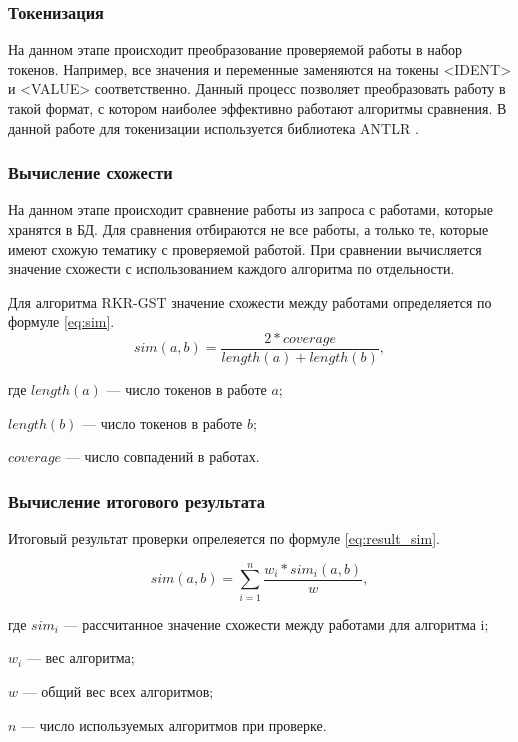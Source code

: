 		\subsubsection{Токенизация}

			На данном этапе происходит преобразование проверяемой работы в набор токенов. Например, все значения и переменные заменяются на токены <IDENT> и <VALUE> соответственно. Данный процесс позволяет преобразовать работу в такой формат, с котором наиболее эффективно работают алгоритмы сравнения. В данной работе для токенизации используется библиотека ANTLR \cite{Parr2013}.

		\subsubsection{Вычисление схожести}

			На данном этапе происходит сравнение работы из запроса с работами, которые хранятся в БД. Для сравнения отбираются не все работы, а только те, которые имеют схожую тематику с проверяемой работой. При сравнении вычисляется значение схожести с использованием каждого алгоритма по отдельности.

			Для алгоритма RKR-GST значение схожести между работами определяется по формуле \ref{eq:sim}.
			\begin{equation}\label{eq:sim}
				sim(a,b) = \frac{ 2 * coverage }{ length(a) + length(b) },
			\end{equation}
			\begin{ESKDexplanation}
				\item[где ] $length(a)$ --- число токенов в работе $a$;
				\item$length(b)$ --- число токенов в работе $b$;
				\item$coverage$ --- число совпадений в работах.		
			\end{ESKDexplanation}

		\subsubsection{Вычисление итогового результата}		

			Итоговый результат проверки опрелеяется по формуле \ref{eq:result_sim}.

			\begin{equation}\label{eq:result_sim}
				sim(a,b) = \sum_{i=1}^{n} \frac{ w_i * sim_i(a,b) }{ w },				 
			\end{equation}
			\begin{ESKDexplanation}
				\item[где ] $sim_i$ --- рассчитанное значение схожести между работами для алгоритма i;
				\item$w_i$ --- вес алгоритма;
				\item$w$ --- общий вес всех алгоритмов;
				\item$n$ --- число используемых алгоритмов при проверке.		
			\end{ESKDexplanation}


